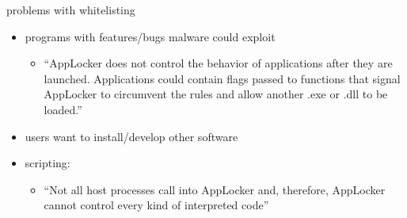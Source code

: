 \begin{frame}{problems with whitelisting}
    \begin{itemize}
    \item programs with features/bugs malware could exploit
        \begin{itemize}
        \item ``AppLocker does not control the behavior of applications after they are launched. Applications could contain flags passed to functions that signal AppLocker to circumvent the rules and allow another .exe or .dll to be loaded.''
        \end{itemize}
    \item users want to install/develop other software
    \item scripting:
        \begin{itemize}
        \item ``Not all host processes call into AppLocker and, therefore, AppLocker cannot control every kind of interpreted code''
        \end{itemize}
    \end{itemize}
\end{frame}
